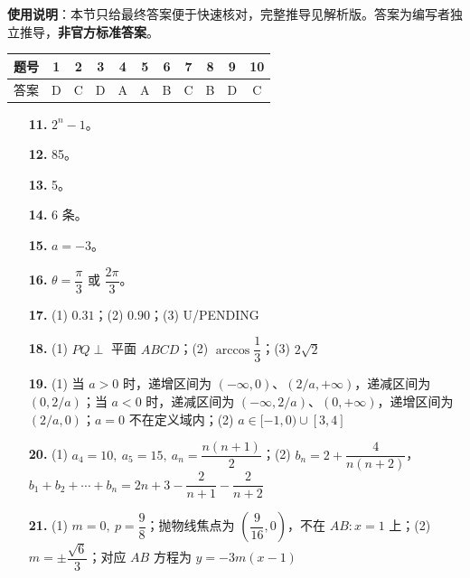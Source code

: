 
\begin{gknotice}
\textbf{使用说明}：本节只给最终答案便于快速核对，完整推导见解析版。答案为编写者独立推导，\textbf{非官方标准答案}。
\end{gknotice}

\begin{center}\begin{tabular}{ccccccccccc}
\toprule
题号 & 1 & 2 & 3 & 4 & 5 & 6 & 7 & 8 & 9 & 10 \\
\midrule
答案 & D & C & D & A & A & B & C & B & D & C \\
\bottomrule
\end{tabular}\end{center}

\begin{itemize}[leftmargin=2.6em]
  \item[\textbf{11.}] $2^n-1$。
  \item[\textbf{12.}] 85。
  \item[\textbf{13.}] 5。
  \item[\textbf{14.}] 6 条。
  \item[\textbf{15.}] $a=-3$。
\end{itemize}

\begin{itemize}[leftmargin=2.6em]
  \item[\textbf{16.}] $\theta=\dfrac\pi3$ 或 $\dfrac{2\pi}3$。
  \item[\textbf{17.}] (1) $0.31$；(2) $0.90$；(3) U/PENDING
  \item[\textbf{18.}] (1) $PQ\perp$ 平面 $ABCD$；(2) $\arccos\dfrac13$；(3) $2\sqrt2$
  \item[\textbf{19.}] (1) 当 $a>0$ 时，递增区间为 $(-\infty,0)$、$(2/a,+\infty)$，递减区间为 $(0,2/a)$；当 $a<0$ 时，递减区间为 $(-\infty,2/a)$、$(0,+\infty)$，递增区间为 $(2/a,0)$；$a=0$ 不在定义域内；(2) $a\in[-1,0)\cup[3,4]$
  \item[\textbf{20.}] (1) $a_4=10,\ a_5=15,\ a_n=\dfrac{n(n+1)}2$；(2) $b_n=2+\dfrac4{n(n+2)}$，$b_1+b_2+\cdots+b_n=2n+3-\dfrac2{n+1}-\dfrac2{n+2}$
  \item[\textbf{21.}] (1) $m=0,\ p=\dfrac98$；抛物线焦点为 $(\dfrac9{16},0)$，不在 $AB:x=1$ 上；(2) $m=\pm\dfrac{\sqrt6}{3}$；对应 $AB$ 方程为 $y=-3m(x-1)$
\end{itemize}
